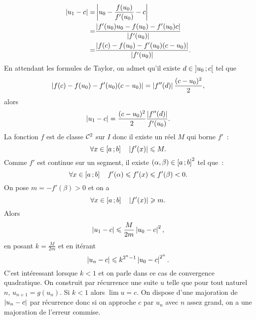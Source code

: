 \begin{align*}
  \left\lvert u_1-c\right\rvert = & \left\lvert u_0 - \frac{f(u_0)}{f'(u_0)} -c\right\rvert \\
  = & \frac{\left\lvert f'(u_0)u_0 - f(u_0) -f'(u_0)c\right\rvert}{\left\lvert f'(u_0)\right\rvert} \\
  = & \frac{\left\lvert f(c)-f(u_0)-f'(u_0)(c-u_0)\right\rvert}{\left\lvert f'(u_0)\right\rvert}.
\end{align*}
En attendant les formules de Taylor, on admet qu'il existe \(d \in
\left] u_0 \, ; {} c \right[\) tel que
\begin{equation}
  \left\lvert f(c)-f(u_0)-f'(u_0)(c-u_0)\right\rvert = \left\lvert f''(d)\right\rvert\frac{(c-u_0)^2}{2},
\end{equation}
alors
\begin{equation}
  \left\lvert u_1-c\right\rvert = \frac{(c-u_0)^2}{2} \frac{\left\lvert f''(d)\right\rvert}{f'(u_0)}.
\end{equation}
La fonction \(f\) est de classe \(\mathcal{C}^{2}\) sur \(I\) donc il existe un réel
\(M\) qui borne \(f'\)~:
\begin{equation}
  \forall x \in \left[ a \, ; {} b \right] \quad \left\lvert f'(x)\right\rvert \leqslant M.
\end{equation}
Comme \(f'\) est continue sur un segment, il existe \((\alpha,\beta) \in
\left[ a \, ; {} b \right]^2\) tel que~:
\begin{equation}
  \forall x \in \left[ a \, ; {} b \right] \quad f'(\alpha) \leqslant f'(x) \leqslant
  f'(\beta) <0.
\end{equation}
On pose \(m=-f'(\beta)>0\) et on a
\begin{equation}
  \forall x \in \left[ a \, ; {} b \right] \quad \left\lvert f'(x)\right\rvert \geqslant m.
\end{equation}
Alors
\begin{equation}
  \left\lvert u_1-c\right\rvert \leqslant \frac{M}{2m} \left\lvert u_0-c\right\rvert^2,
\end{equation}
en posant \(k=\frac{M}{2m}\) et en itérant
\begin{equation}
  \left\lvert u_n-c\right\rvert \leqslant k^{2^n-1} \left\lvert u_0-c\right\rvert^{2^n}.
\end{equation}
C'est intéressant lorsque \(k < 1\) et on parle dans ce cas de convergence
quadratique. On construit par récurrence une suite \(u\) telle que pour tout
naturel \(n\), \(u_{n+1}=g(u_n)\). Si \(k<1\) alors \(\lim u =c\). On dispose
d'une majoration de \(\left\lvert u_n-c\right\rvert\) par récurrence donc si on approche \(c\) par
\(u_n\) avec \(n\) assez grand, on a une majoration de l'erreur commise.
